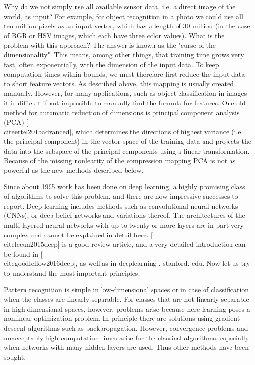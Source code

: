 \documentclass[10pt]{book}
\begin{document}
Why do we not simply use all available sensor data, i.e. a direct image of the world, as input? For example, for object recognition in a photo we could use all ten million pixels as an input vector, which has a length of 30 million (in the case of RGB or HSV images, which each have three color values). What is the problem with this approach? The answer is known as the "curse of the dimensionality". This means, among other things, that training time grows very fast, often exponentially, with the dimension of the input data. To keep computation times within bounds, we must therefore first reduce the input data to short feature vectors. As described above, this mapping is usually created manually. However, for many applications, such as object classification in images it is difficult if not impossible to manually find the formula for features. One old method for automatic reduction of dimensions is principal component analysis (PCA) [\\cite{ertel2015advanced}], which determines the directions of highest variance (i.e. the principal component) in the vector space of the training data and projects the data into the subspace of the principal components using a linear transformation. Because of the missing nonlearity of the compression mapping PCA is not as powerful as the new methods described below.

Since about 1995 work has been done on deep learning, a highly promising class of algorithms to solve this problem, and there are now impressive successes to report. Deep learning includes methods such as convolutional neural networks (CNNs), or deep belief networks and variations thereof. The architectures of the multi-layered neural networks with up to twenty or more layers are in part very complex and cannot be explained in detail here. [\\cite{lecun2015deep}] is a good review article, and a very detailed introduction can be found in [\\cite{goodfellow2016deep}], as well as in deeplearning . stanford. edu. Now let us try to understand the most important principles.

Pattern recognition is simple in low-dimensional spaces or in case of classification when the classes are linearly separable. For classes that are not linearly separable in high dimensional spaces, however, problems arise because here learning poses a nonlinear optimization problem. In principle there are solutions using gradient descent algorithms such as backpropagation. However, convergence problems and unacceptably high computation times arise for the classical algorithms, especially when networks with many hidden layers are used. Thus other methods have been sought.
\end{document}
